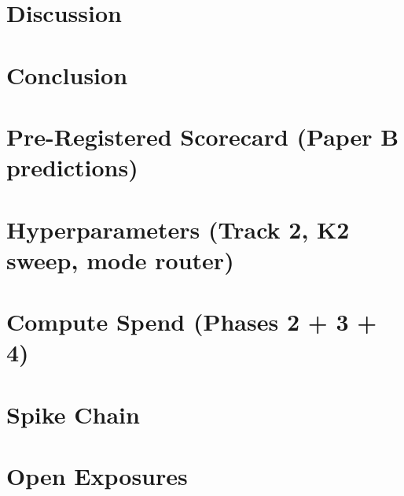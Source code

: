 \documentclass[11pt]{article}
\begin{document}
\section{Discussion}
\label{sec:discussion}


\section{Conclusion}





\appendix

\section{Pre-Registered Scorecard (Paper B predictions)}
\label{app:prereg}


\section{Hyperparameters (Track 2, K2 sweep, mode router)}
\label{app:hyperparams}


\section{Compute Spend (Phases 2 + 3 + 4)}
\label{app:compute}


\section{Spike Chain}
\label{app:spike}


\section{Open Exposures}
\label{app:exposures}

\end{document}
